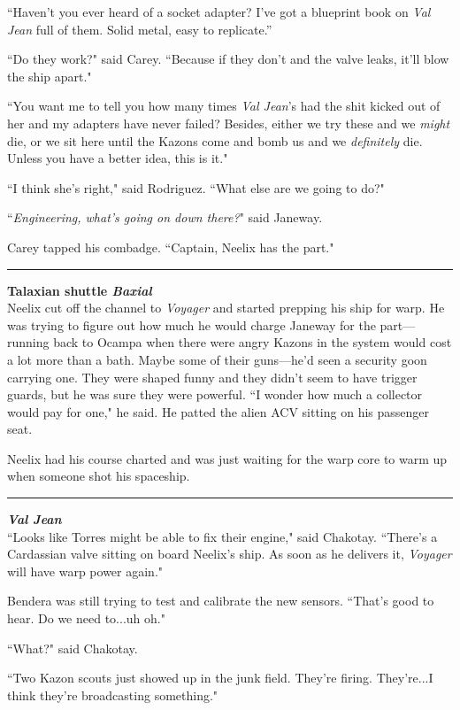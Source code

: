 \documentclass[twoside,letterpaper,12pt]{memoir}
\begin{document}
``Haven’t you ever heard of a socket adapter? I’ve got a blueprint book on \textit{Val Jean }full of them. Solid metal, easy to replicate.”

``Do they work?" said Carey. ``Because if they don't and the valve leaks, it'll blow the ship apart."

``You want me to tell you how many times \textit{Val Jean}'s had the shit kicked out of her and my adapters have never failed? Besides, either we try these and we \textit{might} die, or we sit here until the Kazons come and bomb us and we \textit{definitely} die. Unless you have a better idea, this is it."

``I think she's right," said Rodriguez. ``What else are we going to do?"

``\textit{Engineering, what's going on down there?}" said Janeway.

Carey tapped his combadge. ``Captain, Neelix has the part."

\fancybreak{\rule{3cm}{0.4 pt}}
\noindent\textbf{Talaxian shuttle \textit{Baxial}}\\

Neelix cut off the channel to \textit{Voyager} and started prepping his ship for warp. He was trying to figure out how much he would charge Janeway for the part---running back to Ocampa when there were angry Kazons in the system would cost a lot more than a bath. Maybe some of their guns---he'd seen a security goon carrying one. They were shaped funny and they didn't seem to have trigger guards, but he was sure they were powerful. ``I wonder how much a collector would pay for one," he said. He patted the alien ACV sitting on his passenger seat.

Neelix had his course charted and was just waiting for the warp core to warm up when someone shot his spaceship.

\fancybreak{\rule{3cm}{0.4 pt}}
\noindent\textit{\textbf{Val Jean}}\\

``Looks like Torres might be able to fix their engine," said Chakotay. ``There’s a Cardassian valve sitting on board Neelix's ship. As soon as he delivers it, \textit{Voyager} will have warp power again."

Bendera was still trying to test and calibrate the new sensors. ``That's good to hear. Do we need to...uh oh."

``What?" said Chakotay.

``Two Kazon scouts just showed up in the junk field. They're firing. They're...I think they're broadcasting something."
\end{document}
